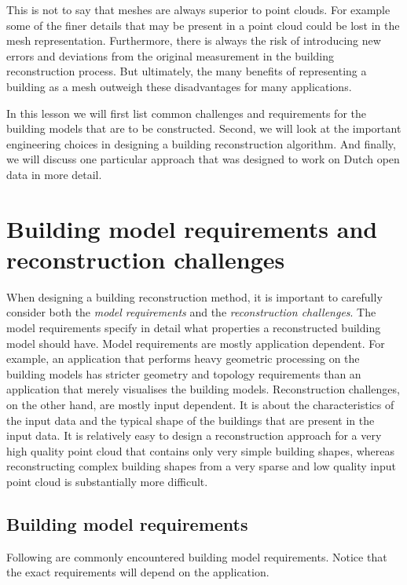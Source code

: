 This is not to say that meshes are always superior to point clouds. 
For example some of the finer details that may be present in a point cloud could be lost in the mesh representation. 
Furthermore, there is always the risk of introducing new errors and deviations from the original measurement in the building reconstruction process. 
But ultimately, the many benefits of representing a building as a mesh outweigh these disadvantages for many applications.

In this lesson we will first list common challenges and requirements for the building models that are to be constructed. Second, we will look at the important engineering choices in designing a building reconstruction algorithm. And finally, we will discuss one particular approach that was designed to work on Dutch open data in more detail.

%
\section{Building model requirements and reconstruction challenges}
When designing a building reconstruction method, it is important to carefully consider both the \emph{model requirements} and the \emph{reconstruction challenges}. 
The model requirements specify in detail what properties a reconstructed building model should have. 
Model requirements are mostly application dependent.
For example, an application that performs heavy geometric processing on the building models has stricter geometry and topology requirements than an application that merely visualises the building models.
Reconstruction challenges, on the other hand, are mostly input dependent. 
It is about the characteristics of the input data and the typical shape of the buildings that are present in the input data.
It is relatively easy to design a reconstruction approach for a very high quality point cloud that contains only very simple building shapes, whereas reconstructing complex building shapes from a very sparse and low quality input point cloud is substantially more difficult.

\subsection{Building model requirements}
Following are commonly encountered building model requirements. Notice that the exact requirements will depend on the application.

